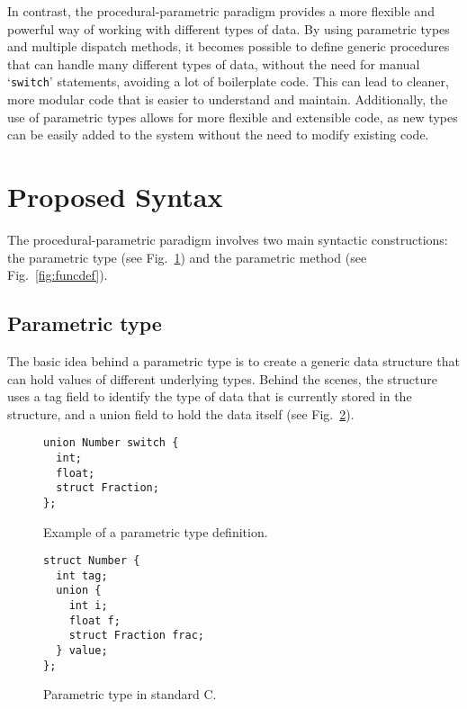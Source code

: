 \documentclass[conference]{IEEEtran}
\begin{document}
In contrast, the procedural-parametric paradigm provides a more flexible and powerful way of working with different types of data.
By using parametric types and multiple dispatch methods, it becomes possible to define generic procedures that can handle many different types of data, without the need for manual `\texttt{switch}' statements, avoiding a lot of boilerplate code.
This can lead to cleaner, more modular code that is easier to understand and maintain.
Additionally, the use of parametric types allows for more flexible and extensible code, as new types can be easily added to the system without the need to modify existing code.

\section{Proposed Syntax}
The procedural-parametric paradigm involves two main syntactic constructions: the parametric type (see Fig.~\ref{fig:typedef}) and the parametric method (see Fig.~\ref{fig:funcdef}).

\subsection{Parametric type} %
The basic idea behind a parametric type is to create a generic data structure that can hold values of different underlying types.
Behind the scenes, the structure uses a tag field to identify the type of data that is currently stored in the structure, and a union field to hold the data itself (see Fig.~\ref{fig:typedefpurec}).

\begin{figure}[htbp]
  \begin{lstlisting}[frame=single,basicstyle=\ttfamily]
union Number switch {
  int;
  float;
  struct Fraction;
};
  \end{lstlisting}
  \caption{Example of a parametric type definition.}
  \label{fig:typedef}
\end{figure}

\begin{figure}[htbp]
  \begin{lstlisting}[frame=single,basicstyle=\ttfamily]
struct Number {
  int tag;
  union {
    int i;
    float f;
    struct Fraction frac;
  } value;
};
  \end{lstlisting}
  \caption{Parametric type in standard C.}
  \label{fig:typedefpurec}
\end{figure}
\end{document}
